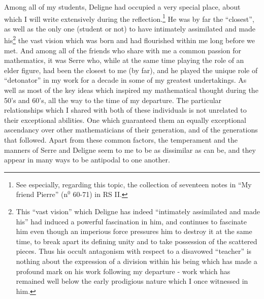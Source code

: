 Among all of my students, Deligne had occupied a very special place, about which I will write
extensively during the reflection.\footnote{See especially, regarding this topic, the
collection of seventeen notes in ``My friend Pierre'' (n$^0$ 60-71) in RS II.} 
He was by far the ``closest'', as well as the only one (student or not)
to have intimately assimilated and made his\footnote{This ``vast vision'' which Deligne
has indeed ``intimately assimilated and made his'' had induced a powerful fascination in
him, and continues to fascinate him even though an imperious force pressures him to
destroy it at the same time, to break apart its defining unity and to take possession of
the scattered pieces. Thus his occult antagonism with respect to a disavowed 
``teacher'' is nothing about the expression of a 
division within his being which has made a profound mark on his work following my
departure - work which has remained well below the early prodigious nature which I once
witnessed in him.} the vast vision which was born and had flourished within me long before we met. 
And among all of the friends who share with me a common passion for mathematics, it was
Serre who, while at the same time playing the role of an elder figure, had been the
closest to me (by far), and he played 
the unique role of ``detonator'' in my work for a decade in some of my greatest
undertakings. As well as 
most of the key ideas which inspired my mathematical thought during the 50's and 60's, all
the way to the time of my departure.
The particular relationships which I shared with both of these individuals 
is not unrelated to their exceptional abilities. One which guaranteed them an equally
exceptional ascendancy over other mathematicians of their generation, and of the
generations that followed. Apart from these common factors, the temperament
and the manners of Serre and Deligne
seem to me to be as dissimilar as can be, and they appear in many ways to be
antipodal to one another.

